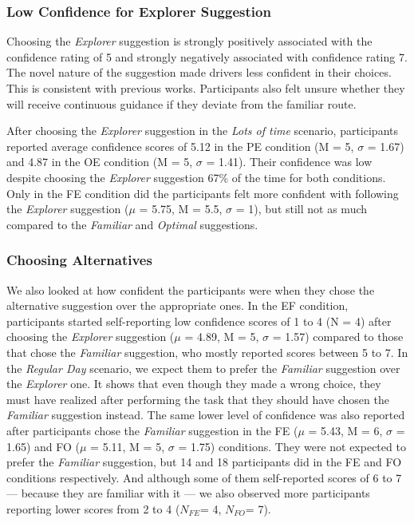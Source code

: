 \subsubsection{Low Confidence for Explorer Suggestion}
Choosing the \textit{Explorer} suggestion is strongly positively associated with the confidence rating of 5 and strongly negatively associated with confidence rating 7. The novel nature of the suggestion made drivers less confident in their choices. This is consistent with previous works. Participants also felt unsure whether they will receive continuous guidance if they deviate from the familiar route.

After choosing the \textit{Explorer} suggestion in the \textit{Lots of time} scenario, participants reported average confidence scores of 5.12 in the PE condition (M = 5, $\sigma$ = 1.67) and 4.87 in the OE condition (M = 5, $\sigma$ = 1.41). Their confidence was low despite choosing the \textit{Explorer} suggestion 67\% of the time for both conditions. Only in the FE condition did the participants felt more confident with following the \textit{Explorer} suggestion ($\mu$ =  5.75, M = 5.5, $\sigma$ = 1), but still not as much compared to the \textit{Familiar} and \textit{Optimal} suggestions.

\subsubsection{Choosing Alternatives}
 We also looked at how confident the participants were when they chose the alternative suggestion over the appropriate ones. In the EF condition, participants started self-reporting low confidence scores of 1 to 4 (N = 4) after choosing the \textit{Explorer} suggestion ($\mu$ =  4.89, M = 5, $\sigma$ = 1.57) compared to those that chose the \textit{Familiar} suggestion, who mostly reported scores between 5 to 7. In the \textit{Regular Day} scenario, we expect them to prefer the \textit{Familiar} suggestion over the \textit{Explorer} one. It shows that even though they made a wrong choice, they must have realized after performing the task that they should have chosen the \textit{Familiar} suggestion instead. The same lower level of confidence was also reported after participants chose the \textit{Familiar} suggestion in the FE ($\mu$ =  5.43, M = 6, $\sigma$ = 1.65) and FO ($\mu$ =  5.11, M = 5, $\sigma$ = 1.75) conditions. They were not expected to prefer the \textit{Familiar} suggestion, but 14 and 18 participants did in the FE and FO conditions respectively. And although some of them self-reported scores of 6 to 7 --- because they are familiar with it --- we also observed more participants reporting lower scores from 2 to 4 ($N_{FE}$= 4, $N_{FO}$= 7). 

